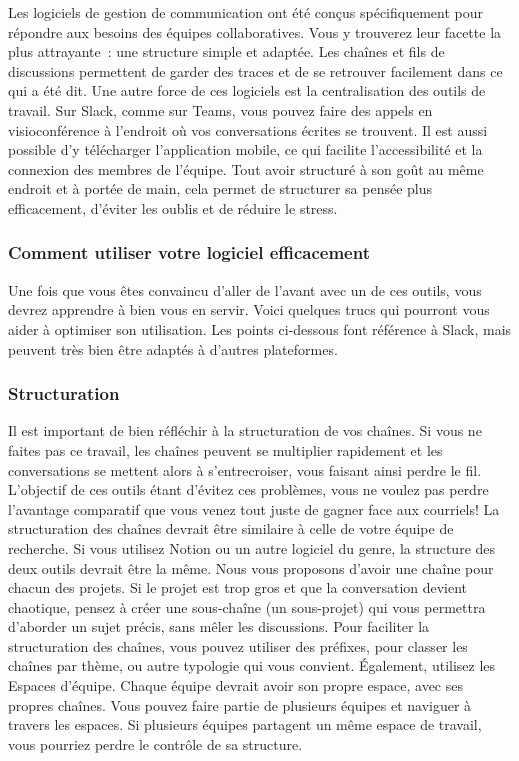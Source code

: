 \documentclass[
  letterpaper,
  DIV=11,
  numbers=noendperiod]{scrreprt}
\begin{document}
Les logiciels de gestion de communication ont été conçus spécifiquement
pour répondre aux besoins des équipes collaboratives. Vous y trouverez
leur facette la plus attrayante~: une structure simple et adaptée. Les
chaînes et fils de discussions permettent de garder des traces et de se
retrouver facilement dans ce qui a été dit. Une autre force de ces
logiciels est la centralisation des outils de travail. Sur Slack, comme
sur Teams, vous pouvez faire des appels en visioconférence à l'endroit
où vos conversations écrites se trouvent. Il est aussi possible d'y
télécharger l'application mobile, ce qui facilite l'accessibilité et la
connexion des membres de l'équipe. Tout avoir structuré à son goût au
même endroit et à portée de main, cela permet de structurer sa pensée
plus efficacement, d'éviter les oublis et de réduire le stress.

\subsubsection{Comment utiliser votre logiciel
efficacement}\label{comment-utiliser-votre-logiciel-efficacement}

Une fois que vous êtes convaincu d'aller de l'avant avec un de ces
outils, vous devrez apprendre à bien vous en servir. Voici quelques
trucs qui pourront vous aider à optimiser son utilisation. Les points
ci-dessous font référence à Slack, mais peuvent très bien être adaptés à
d'autres plateformes.

\subsubsection{Structuration}\label{structuration}

Il est important de bien réfléchir à la structuration de vos chaînes. Si
vous ne faites pas ce travail, les chaînes peuvent se multiplier
rapidement et les conversations se mettent alors à s'entrecroiser, vous
faisant ainsi perdre le fil. L'objectif de ces outils étant d'évitez ces
problèmes, vous ne voulez pas perdre l'avantage comparatif que vous
venez tout juste de gagner face aux courriels! La structuration des
chaînes devrait être similaire à celle de votre équipe de recherche. Si
vous utilisez Notion ou un autre logiciel du genre, la structure des
deux outils devrait être la même. Nous vous proposons d'avoir une chaîne
pour chacun des projets. Si le projet est trop gros et que la
conversation devient chaotique, pensez à créer une sous-chaîne (un
sous-projet) qui vous permettra d'aborder un sujet précis, sans mêler
les discussions. Pour faciliter la structuration des chaînes, vous
pouvez utiliser des préfixes, pour classer les chaînes par thème, ou
autre typologie qui vous convient. Également, utilisez les Espaces
d'équipe. Chaque équipe devrait avoir son propre espace, avec ses
propres chaînes. Vous pouvez faire partie de plusieurs équipes et
naviguer à travers les espaces. Si plusieurs équipes partagent un même
espace de travail, vous pourriez perdre le contrôle de sa structure.
\end{document}
